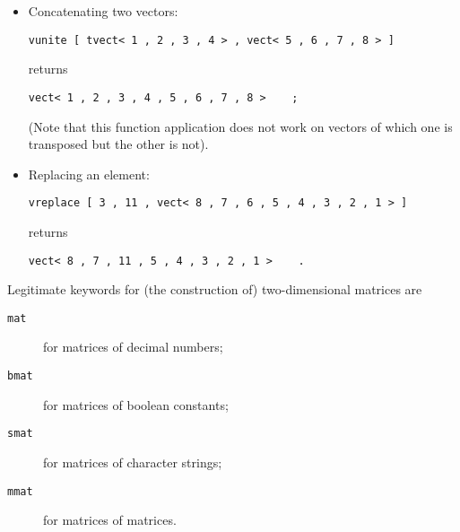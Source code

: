 \begin{itemize}
\item Concatenating two vectors:
\begin{verbatim}
vunite [ tvect< 1 , 2 , 3 , 4 > , vect< 5 , 6 , 7 , 8 > ]
\end{verbatim}
returns
\begin{verbatim}
vect< 1 , 2 , 3 , 4 , 5 , 6 , 7 , 8 >    ;
\end{verbatim}
(Note that this function application does not work on
vectors of which one is transposed but the other is not).
\item Replacing an element:
\begin{verbatim}
vreplace [ 3 , 11 , vect< 8 , 7 , 6 , 5 , 4 , 3 , 2 , 1 > ]
\end{verbatim}
returns
\begin{verbatim}
vect< 8 , 7 , 11 , 5 , 4 , 3 , 2 , 1 >    .
\end{verbatim}
\end{itemize}

Legitimate keywords for (the construction of) two-dimensional
matrices are
\begin{description}
\item[{\tt mat}] for matrices of decimal numbers;
\item[{\tt bmat}] for matrices of boolean constants;
\item[{\tt smat}] for matrices of character strings;
\item[{\tt mmat}] for matrices of matrices.
\end{description}

